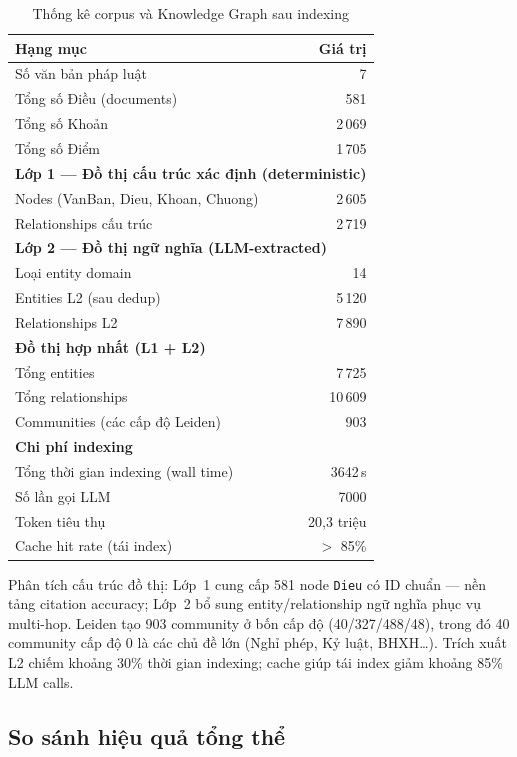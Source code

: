 \documentclass[../DoAn.tex]{subfiles}
\begin{document}
\begin{table}[htbp]
\centering
\caption{Thống kê corpus và Knowledge Graph sau indexing}
\label{table:indexing_stats}
\begin{tabular}{|l|r|}
\hline
\textbf{Hạng mục} & \textbf{Giá trị} \\
\hline
Số văn bản pháp luật & 7 \\
Tổng số Điều (documents) & 581 \\
Tổng số Khoản & 2\,069 \\
Tổng số Điểm & 1\,705 \\
\hline
\multicolumn{2}{|l|}{\textbf{Lớp 1 --- Đồ thị cấu trúc xác định (deterministic)}} \\
Nodes (VanBan, Dieu, Khoan, Chuong) & 2\,605 \\
Relationships cấu trúc & 2\,719 \\
\hline
\multicolumn{2}{|l|}{\textbf{Lớp 2 --- Đồ thị ngữ nghĩa (LLM-extracted)}} \\
Loại entity domain & 14 \\
Entities L2 (sau dedup) & 5\,120 \\
Relationships L2 & 7\,890 \\
\hline
\multicolumn{2}{|l|}{\textbf{Đồ thị hợp nhất (L1 + L2)}} \\
Tổng entities & 7\,725 \\
Tổng relationships & 10\,609 \\
Communities (các cấp độ Leiden) & 903 \\
\hline
\multicolumn{2}{|l|}{\textbf{Chi phí indexing}} \\
Tổng thời gian indexing (wall time) & 3642\,s \\
Số lần gọi LLM & 7000 \\
Token tiêu thụ & 20,3 triệu \\
Cache hit rate (tái index) & $>$ 85\% \\
\hline
\end{tabular}
\end{table}

Phân tích cấu trúc đồ thị: Lớp~1 cung cấp 581 node \texttt{Dieu} có ID chuẩn --- nền tảng citation accuracy; Lớp~2 bổ sung entity/relationship ngữ nghĩa phục vụ multi-hop. Leiden tạo 903 community ở bốn cấp độ (40/327/488/48), trong đó 40 community cấp độ 0 là các chủ đề lớn (Nghỉ phép, Kỷ luật, BHXH\ldots). Trích xuất L2 chiếm khoảng 30\% thời gian indexing; cache giúp tái index giảm khoảng 85\% LLM calls.

\subsection{So sánh hiệu quả tổng thể}
\label{subsection:4.4.2}
\end{document}
